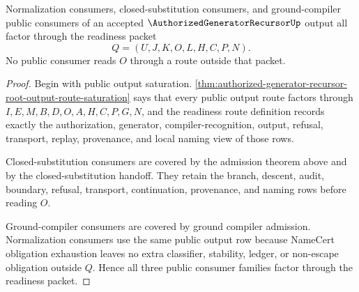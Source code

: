 \begin{theorem}
\label{thm:authorized-generator-recursor-public-output-coverage}
Normalization consumers, closed-substitution consumers, and ground-compiler public consumers of an accepted $\AuthorizedGeneratorRecursorUp$ output all factor through the readiness packet
$$
Q=(U,J,K,O,L,H,C,P,N).
$$
No public consumer reads $O$ through a route outside that packet.
\end{theorem}
\begin{proof}
Begin with public output saturation. \autoref{thm:authorized-generator-recursor-root-output-route-saturation} says that every public output route factors through $I,E,M,B,D,O,A,H,C,P,G,N$, and the readiness route definition records exactly the authorization, generator, compiler-recognition, output, refusal, transport, replay, provenance, and local naming view of those rows.

Closed-substitution consumers are covered by the admission theorem above and by the closed-substitution handoff. They retain the branch, descent, audit, boundary, refusal, transport, continuation, provenance, and naming rows before reading $O$.

Ground-compiler consumers are covered by ground compiler admission. Normalization consumers use the same public output row because NameCert obligation exhaustion leaves no extra classifier, stability, ledger, or non-escape obligation outside $Q$. Hence all three public consumer families factor through the readiness packet.
\end{proof}

